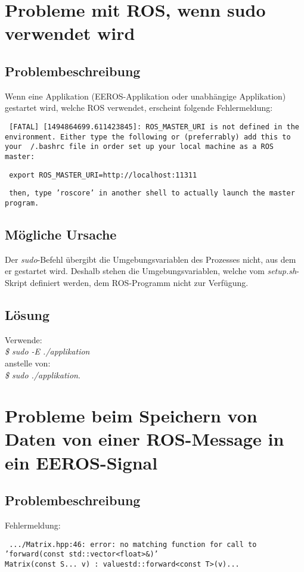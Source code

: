 \section{Probleme mit ROS, wenn sudo verwendet wird}
\subsection{Problembeschreibung}
Wenn eine Applikation (EEROS-Applikation oder unabhängige Applikation) gestartet wird, welche ROS verwendet, erscheint folgende Fehlermeldung:


\texttt{
[FATAL] [1494864699.611423845]: ROS\_MASTER\_URI is not defined in the environment. Either type the following or (preferrably) add this to your ~/.bashrc file in order set up your local machine as a ROS master:
}

\texttt{
export ROS\_MASTER\_URI=http://localhost:11311
}

\texttt{
then, type 'roscore' in another shell to actually launch the master program.
}

\subsection{Mögliche Ursache}
Der \textit{sudo}-Befehl übergibt die Umgebungsvariablen des Prozesses nicht, aus dem er gestartet wird.
Deshalb stehen die Umgebungsvariablen, welche vom \textit{setup.sh}-Skript definiert werden, dem ROS-Programm nicht zur Verfügung.

\subsection{Lösung}
Verwende: \\
\textit{\$ sudo -E ./applikation} \\
anstelle von: \\
\textit{\$ sudo ./applikation}.



\section{Probleme beim Speichern von Daten von einer ROS-Message in ein EEROS-Signal}

\subsection{Problembeschreibung}
Fehlermeldung:

\texttt{
.../Matrix.hpp:46: error: no matching function for call to \\
'forward(const std::vector<float>\&)' \\
\-\hspace{2cm} Matrix(const S... v) : value{std::forward<const T>(v)...} 
}

